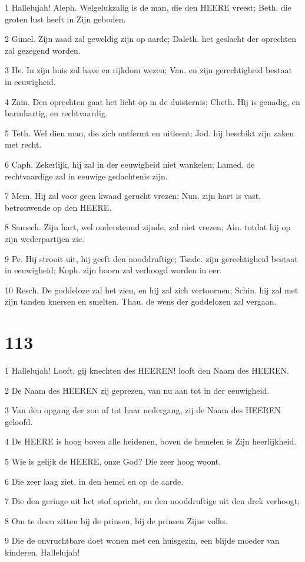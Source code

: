 \par 1 Hallelujah! Aleph. Welgelukzalig is de man, die den HEERE vreest; Beth. die groten lust heeft in Zijn geboden.
\par 2 Gimel. Zijn zaad zal geweldig zijn op aarde; Daleth. het geslacht der oprechten zal gezegend worden.
\par 3 He. In zijn huis zal have en rijkdom wezen; Vau. en zijn gerechtigheid bestaat in eeuwigheid.
\par 4 Zain. Den oprechten gaat het licht op in de duisternis; Cheth. Hij is genadig, en barmhartig, en rechtvaardig.
\par 5 Teth. Wel dien man, die zich ontfermt en uitleent; Jod. hij beschikt zijn zaken met recht.
\par 6 Caph. Zekerlijk, hij zal in der eeuwigheid niet wankelen; Lamed. de rechtvaardige zal in eeuwige gedachtenis zijn.
\par 7 Mem. Hij zal voor geen kwaad gerucht vrezen; Nun. zijn hart is vast, betrouwende op den HEERE.
\par 8 Samech. Zijn hart, wel ondersteund zijnde, zal niet vrezen; Ain. totdat hij op zijn wederpartijen zie.
\par 9 Pe. Hij strooit uit, hij geeft den nooddruftige; Tsade. zijn gerechtigheid bestaat in eeuwigheid; Koph. zijn hoorn zal verhoogd worden in eer.
\par 10 Resch. De goddeloze zal het zien, en hij zal zich vertoornen; Schin. hij zal met zijn tanden knersen en smelten. Thau. de wens der goddelozen zal vergaan.

\chapter{113}

\par 1 Hallelujah! Looft, gij knechten des HEEREN! looft den Naam des HEEREN.
\par 2 De Naam des HEEREN zij geprezen, van nu aan tot in der eeuwigheid.
\par 3 Van den opgang der zon af tot haar nedergang, zij de Naam des HEEREN geloofd.
\par 4 De HEERE is hoog boven alle heidenen, boven de hemelen is Zijn heerlijkheid.
\par 5 Wie is gelijk de HEERE, onze God? Die zeer hoog woont.
\par 6 Die zeer laag ziet, in den hemel en op de aarde.
\par 7 Die den geringe uit het stof opricht, en den nooddruftige uit den drek verhoogt;
\par 8 Om te doen zitten bij de prinsen, bij de prinsen Zijns volks.
\par 9 Die de onvruchtbare doet wonen met een huisgezin, een blijde moeder van kinderen. Hallelujah!

